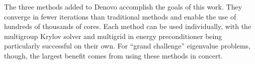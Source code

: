 \vspace*{0.5em}
\noindent       %
The three methods added to Denovo accomplish the goals of this work. They converge in fewer iterations than traditional methods and enable the use of hundreds of thousands of cores. Each method can be used individually, with the multigroup Krylov solver and multigrid in energy preconditioner being particularly successful on their own. For ``grand challenge'' eigenvalue problems, though, the largest benefit comes from using these methods in concert. 

